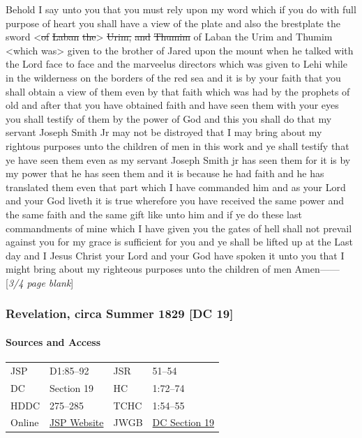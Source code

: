 				Behold I say unto you that you must rely upon my word which if you do with full purpose of heart you shall have a view of the plate and also the brestplate the sword <\sout{of} \sout{Laban} \sout{the}> \sout{Urim,} \sout{and} \sout{Thumim} of Laban the Urim and Thumim <which was> given to the brother of Jared upon the mount when he talked with the Lord face to face and the marveelus directors which was given to Lehi while in the wilderness on the borders of the red sea and it is by your faith that you shall obtain a view of them even by that faith which was had by the prophets of old and after that you have obtained faith and have seen them with your eyes you shall testify of them by the power of God and this you shall do that my servant Joseph Smith Jr may not be distroyed that I may bring about my rightous purposes unto the children of men in this work and ye shall testify that ye have seen them even as my servant Joseph Smith jr has seen them for it is by my power that he has seen them and it is because he had faith and he has translated them even that part which I have commanded him and as your Lord and your God liveth it is true wherefore you have received the same power and the same faith and the same gift like unto him and if ye do these last commandments of mine which I have given you the gates of hell shall not prevail against you for my grace is sufficient for you and ye shall be lifted up at the Last day and I Jesus Christ your Lord and your God have spoken it unto you that I might bring about my righteous purposes unto the children of men Amen------ [\textit{3/4 page blank}]
			
		\subsubsection{Revelation, circa Summer 1829 [DC 19]}
			\label{EMS-1828-1829-JS-CIR-SUM-1829}
			
			\paragraph{Sources and Access}

				\begin{tabular}{p{1in}p{1.5in}p{1in}p{1.5in}}
				JSP	 	& D1:85--92		& JSR 		& 51--54	 \\  
				DC	 	& Section 19 	& HC 		& 1:72--74	 \\
				HDDC 	& 275--285 		& TCHC 		& 1:54--55	 \\
				Online  & \href{https://www.josephsmithpapers.org/paper-summary/revelation-circa-summer-1829-dc-19/1}{JSP Website} & 
				JWGB	& \hyperref[DC19]{DC Section 19} \\
				\end{tabular}
			
